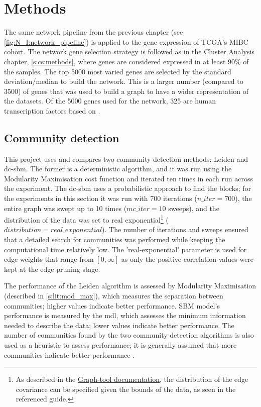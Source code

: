\section{Methods}


The same network pipeline from the previous chapter (see \cref{fig:N_I:network_pipeline}) is applied to the gene expression of TCGA's MIBC cohort. The network gene selection strategy is followed as in the Cluster Analysis chapter, \cref{s:cs:methods}, where genes are considered expressed in at least 90\% of the samples. The top 5000 most varied genes are selected by the standard deviation/median to build the network. This is a larger number (compared to 3500) of genes that was used to build a graph to have a wider representation of the datasets. Of the 5000 genes used for the network, 325 are human transcription factors based on \citet{Lambert2018-el}.
 
\subsection*{Community detection} \label{s:N_I:sel_tfs_methods_comm_detection}

This project uses and compares two community detection methods: Leiden and \acrfull{dc-sbm}. The former is a deterministic algorithm, and it was run using the Modularity Maximisation cost function and iterated ten times in each run across the experiment. The \acrshort{dc-sbm} uses a probabilistic approach to find the blocks; for the experiments in this section it was run with 700 iterations ($n\_iter=700$), the entire graph was swept up to 10 times ($mc\_iter=10$ sweeps), and the distribution of the data was set to real exponential\footnote{As described in the \href{https://graph-tool.skewed.de/static/doc/demos/inference/inference.html}{Graph-tool documentation}, the distribution of the edge covariance can be specified given the bounds of the data, as seen in the referenced guide.} ($distribution=real\_exponential$). The number of iterations and sweeps ensured that a detailed search for communities was performed while keeping the computational time relatively low. The 'real-exponential' parameter is used for edge weights that range from $[0, \infty]$ as only the positive correlation values were kept at the edge pruning stage.

The performance of the Leiden algorithm is assessed by Modularity Maximisation (described in \cref{s:lit:mod_max}), which measures the separation between communities; higher values indicate better performance. SBM model's performance is measured by the \acrfull{mdl}, which assesses the minimum information needed to describe the data; lower values indicate better performance. The number of communities found by the two community detection algorithms is also used as a heuristic to assess performance; it is generally assumed that more communities indicate better performance \citep{Care2019-ij}.

